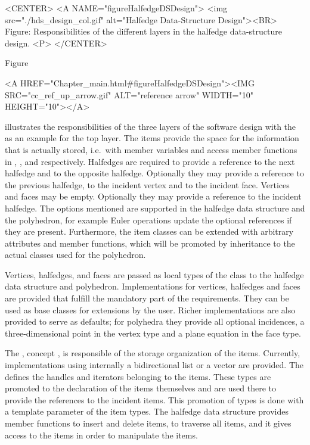 \begin{ccHtmlOnly}
    <CENTER>
    <A NAME="figureHalfedgeDSDesign">
        <img src="./hds_design_col.gif"
         alt="Halfedge Data-Structure Design"><BR>
    Figure: Responsibilities of the different layers in the 
            halfedge data-structure design.
    <P>
    </CENTER>
\end{ccHtmlOnly}

Figure~\ccTexHtml{\ref{figureHalfedgeDSDesign}}{}\begin{ccHtmlOnly}
  <A HREF="Chapter_main.html#figureHalfedgeDSDesign"><IMG 
  SRC="cc_ref_up_arrow.gif" ALT="reference arrow" WIDTH="10" HEIGHT="10"></A>
\end{ccHtmlOnly}
illustrates the responsibilities of the three layers of the software
design with the  as an example for the top
layer.  The items provide the space for the information that is
actually stored, i.e.~with member variables and access member
functions in , , and 
respectively. Halfedges are required to provide a reference to the
next halfedge and to the opposite halfedge.  Optionally they may
provide a reference to the previous halfedge, to the incident vertex
and to the incident face. Vertices and faces may be empty. Optionally
they may provide a reference to the incident halfedge. The options
mentioned are supported in the halfedge data structure and the
polyhedron, for example Euler operations update the optional
references if they are present. Furthermore, the item classes can be
extended with arbitrary attributes and member functions, which will be
promoted by inheritance to the actual classes used for the polyhedron.

Vertices, halfedges, and faces are passed as local types of the
 class to the halfedge data structure and polyhedron.
Implementations for vertices, halfedges and faces are provided that
fulfill the mandatory part of the requirements. They can be used as
base classes for extensions by the user. Richer implementations are
also provided to serve as defaults; for polyhedra they provide all
optional incidences, a three-dimensional point in the vertex type and
a plane equation in the face type.

The , concept , is
responsible of the storage organization of the items. Currently,
implementations using internally a bidirectional list or a
vector are provided. The
 defines the handles and iterators
belonging to the items. These types are promoted to the declaration of
the items themselves and are used there to provide the references to
the incident items. This promotion of types is done with a template
parameter  of the item types.  The halfedge data structure
provides member functions to insert and delete items, to traverse all
items, and it gives access to the items in order to manipulate the
items.

